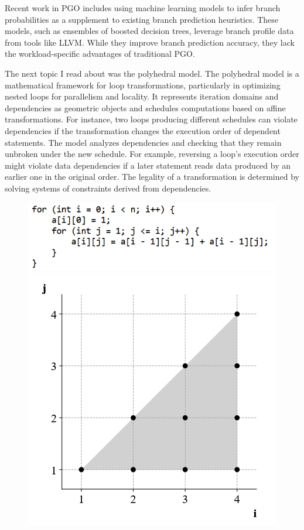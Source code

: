 \documentclass[11pt, a4paper, titlepage]{article}
\begin{document}
Recent work in PGO includes using machine learning models to infer branch probabilities as a supplement to existing branch prediction heuristics. These models, such as ensembles of boosted decision trees, leverage branch profile data from tools like LLVM. While they improve branch prediction accuracy, they lack the workload-specific advantages of traditional PGO.

The next topic I read about was the polyhedral model. The polyhedral model is a mathematical framework for loop transformations, particularly in optimizing nested loops for parallelism and locality. It represents iteration domains and dependencies as geometric objects and schedules computations based on affine transformations. For instance, two loops producing different schedules can violate dependencies if the transformation changes the execution order of dependent statements. The model analyzes dependencies and checking that they remain unbroken under the new schedule. For example, reversing a loop’s execution order might violate data dependencies if a later statement reads data produced by an earlier one in the original order. The legality of a transformation is determined by solving systems of constraints derived from dependencies.

\begin{figure}[H]
  \centering
  \includegraphics[scale=0.4]{images/r18.png}
  \includegraphics[scale=0.4]{images/r19.png}
\end{figure}
\end{document}
